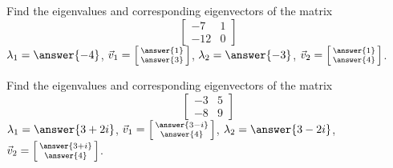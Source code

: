 \documentclass{ximera}
\begin{document}
\begin{exercise}%
    Find the eigenvalues and corresponding eigenvectors of the matrix 
    \[ 
        \begin{bmatrix} 
        -7 & 1 \\ 
        -12 & 0 
        \end{bmatrix} 
    \]
    $\lambda_1 = \answer{-4}$, $\vec{v}_1 = \left[\begin{smallmatrix} \answer{1} \\ \answer{3} \end{smallmatrix}\right]$, $\lambda_2 = \answer{-3}$, $\vec{v}_2 = \left[\begin{smallmatrix} \answer{1} \\ \answer{4} \end{smallmatrix}\right]$. 
\end{exercise}

\begin{exercise}%
    Find the eigenvalues and corresponding eigenvectors of the matrix 
    \[ 
        \begin{bmatrix} 
        -3 & 5 \\ 
        -8 & 9 
        \end{bmatrix} 
    \]
    $\lambda_1 = \answer{3+2i}$, $\vec{v}_1 = \left[\begin{smallmatrix} \answer{3-i} \\ \answer{4} \end{smallmatrix}\right]$, $\lambda_2 = \answer{3-2i}$, $\vec{v}_2 = \left[\begin{smallmatrix} \answer{3+i} \\ \answer{4} \end{smallmatrix}\right]$. 
\end{exercise}
\end{document}

